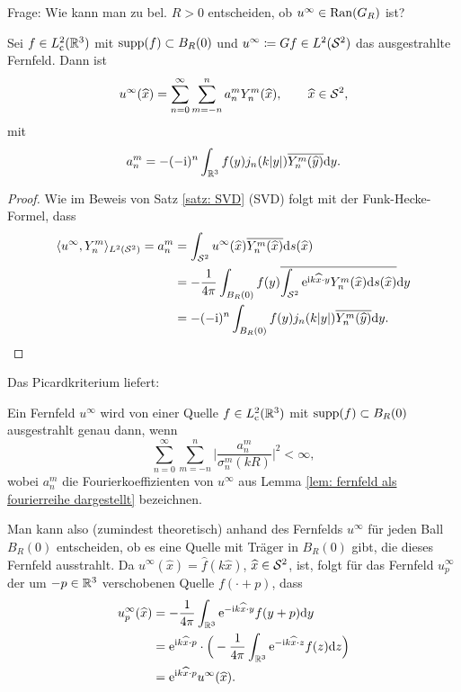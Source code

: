 Frage: Wie kann man zu bel. \(R>0\) entscheiden, ob \(u^\infty\in\operatorname{Ran}(G_R)\) ist?
\begin{lem}\label{lem: fernfeld als fourierreihe dargestellt}
	Sei \(f\in L_{\mathrm{c}}^2(\mathbb{R}^3)\) mit \(\operatorname{supp}(f)\subset B_R(0)\) und \(u^\infty\coloneqq Gf\in L^2(\mathcal{S}^2)\) das ausgestrahlte Fernfeld. Dann ist
	\begin{equation}
		\label{ausgestrahltes fernfeld iqp}
		u^\infty(\widehat{x})=\sum_{n=0}^\infty\sum_{m=-n}^na_n^mY_n^m(\widehat{x}),\qquad\widehat{x}\in\mathcal{S}^2,
	\end{equation}
	mit
	\begin{equation*}
		a_n^m=-(-\mathrm{i})^n\int_{\mathbb{R}^3}f(y)j_n(k|y|)\overline{Y_n^m(\widehat{y})}\mathrm{d}y.
	\end{equation*}
\end{lem}
\begin{proof}
	Wie im Beweis von Satz \ref{satz: SVD} (SVD) folgt mit der Funk-Hecke-Formel, dass
	\begin{align*}
		\langle u^\infty, Y_n^m\rangle_{L^2(\mathcal{S}^2)} = a_n^m
		&=\int_{\mathcal{S}^2}u^\infty(\widehat{x})\overline{Y_n^m(\widehat{x})}\mathrm{d}s(\widehat{x})\\
		&=-\frac{1}{4\pi}\int_{B_R(0)}f(y)\overline{\int_{\mathcal{S}^2}\mathrm{e}^{\mathrm{i} k\widehat{x}\cdot y}Y_n^m(\widehat{x})\mathrm{d}s(\widehat{x})}\mathrm{d}y\\
		&=-(-\mathrm{i})^n\int_{B_R(0)}f(y)j_n(k|y|)\overline{Y_n^m(\widehat{y})}\mathrm{d}y.
	\end{align*}
\end{proof}
Das Picardkriterium liefert:
\begin{cor}
	Ein Fernfeld \(u^\infty\) wird von einer Quelle \(f\in L_{\mathrm{c}}^2(\mathbb{R}^3)\) mit \(\operatorname{supp}(f)\subset B_R(0)\) ausgestrahlt genau dann, wenn
	\begin{equation*}
		\sum_{n=0}^\infty\sum_{m=-n}^n\Big|\frac{a_n^m}{\sigma_n^m(kR)}\Big|^2<\infty,
	\end{equation*}
	wobei \(a_n^m\) die Fourierkoeffizienten von \(u^\infty\) aus Lemma \ref{lem: fernfeld als fourierreihe dargestellt} bezeichnen.
\end{cor}
Man kann also (zumindest theoretisch) anhand des Fernfelds \(u^\infty\) für jeden Ball \(B_R(0)\) entscheiden, ob es eine Quelle mit Träger in \(B_R(0)\) gibt, die dieses Fernfeld ausstrahlt. Da \(u^\infty(\widehat{x})=\widehat{f}(k\widehat{x})\), \(\widehat{x}\in\mathcal{S}^2\), ist, folgt für das Fernfeld \(u_p^\infty\) der um \(-p\in\mathbb{R}^3\) verschobenen Quelle \(f(\cdot+p)\), dass 
\begin{equation}
	\label{fernfeld der um -p verschobenen quelle}
	\begin{aligned}
		u_p^\infty(\widehat{x})&=-\frac{1}{4\pi}\int_{\mathbb{R}^3}\mathrm{e}^{-\mathrm{i} k\widehat{x}\cdot y}f(y+p)\mathrm{d}y\\
		&=\mathrm{e}^{\mathrm{i} k\widehat{x}\cdot p}\cdot\Big(-\frac{1}{4\pi}\int_{\mathbb{R}^3}\mathrm{e}^{-\mathrm{i} k\widehat{x}\cdot z}f(z)\mathrm{d}z\Big)\\
		&=\mathrm{e}^{\mathrm{i} k\widehat{x}\cdot p}u^\infty(\widehat{x}).
	\end{aligned}
\end{equation}
